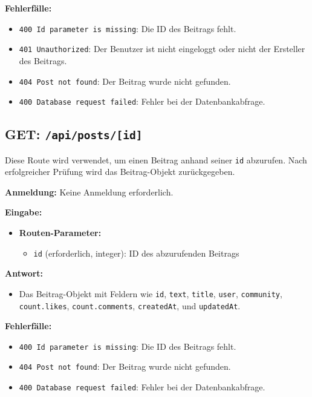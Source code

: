 \documentclass[a4paper,12pt]{article}
\begin{document}
\textbf{Fehlerfälle:}
\begin{itemize}
    \item \texttt{400 Id parameter is missing}:
        Die ID des Beitrags fehlt.
    \item \texttt{401 Unauthorized}:
        Der Benutzer ist nicht eingeloggt oder nicht der Ersteller des Beitrags.
    \item \texttt{404 Post not found}:
        Der Beitrag wurde nicht gefunden.
    \item \texttt{400 Database request failed}:
        Fehler bei der Datenbankabfrage.
\end{itemize}

\newpage
\subsection{GET: \texttt{/api/posts/[id]}}

Diese Route wird verwendet, um einen Beitrag anhand seiner \texttt{id}
abzurufen. Nach erfolgreicher Prüfung wird das Beitrag-Objekt zurückgegeben.

\textbf{Anmeldung:} Keine Anmeldung erforderlich.

\textbf{Eingabe:}
\begin{itemize}
    \item \textbf{Routen-Parameter:}
    \begin{itemize}
        \item \texttt{id} (erforderlich, integer):
            ID des abzurufenden Beitrags
    \end{itemize}
\end{itemize}

\textbf{Antwort:}
\begin{itemize}
    \item Das Beitrag-Objekt mit Feldern wie
        \texttt{id},
        \texttt{text},
        \texttt{title},
        \texttt{user},
        \texttt{community},
        \texttt{count.likes},
        \texttt{count.comments},
        \texttt{createdAt}, und
        \texttt{updatedAt}.
\end{itemize}

\textbf{Fehlerfälle:}
\begin{itemize}
    \item \texttt{400 Id parameter is missing}:
        Die ID des Beitrags fehlt.
    \item \texttt{404 Post not found}:
        Der Beitrag wurde nicht gefunden.
    \item \texttt{400 Database request failed}:
        Fehler bei der Datenbankabfrage.
\end{itemize}
\end{document}
